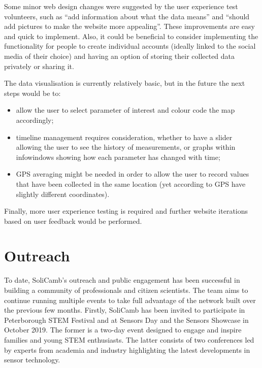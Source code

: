 Some minor web design changes were suggested by the user experience test volunteers, such as ``add information about what the data means'' and ``should add pictures to make the website more appealing''. These improvements are easy and quick to implement. Also, it could be beneficial to consider implementing the functionality for people to create individual accounts (ideally linked to the social media of their choice) and having an option of storing their collected data privately or sharing it. 

The data visualisation is currently relatively basic, but in the future the next steps would be to:
\begin{itemize}
    \item allow the user to select parameter of interest and colour code the map accordingly;
    \item timeline management requires consideration, whether to have a slider allowing the user to see the history of measurements, or graphs within infowindows showing how each parameter has changed with time;
    \item GPS averaging might be needed in order to allow the user to record values that have been collected in the same location (yet according to GPS have slightly different coordinates).
\end{itemize}

Finally, more user experience testing is required and further website iterations based on user feedback would be performed.


\section{Outreach}
To date, SoliCamb's outreach and public engagement has been successful in building a community of professionals and citizen scientists. The team aims to continue running multiple events to take full advantage of the network built over the previous few months. Firstly, SoliCamb has been invited to participate in  Peterborough STEM Festival and at Sensors Day and the Sensors  Showcase in October 2019. The former is a two-day event designed to engage and inspire families and young STEM enthusiasts.  The latter consists of two conferences led by experts from academia and industry highlighting the latest developments in sensor technology.

